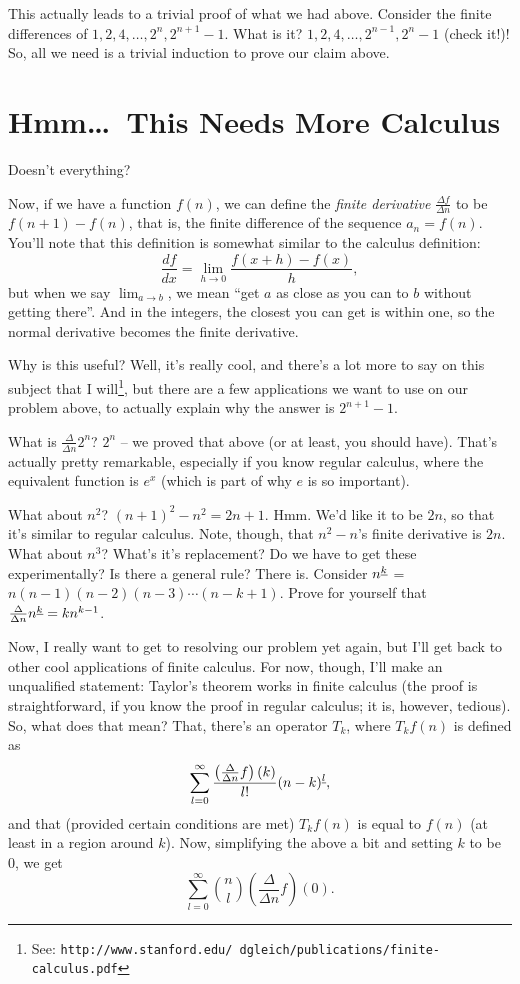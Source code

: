 \documentclass[12pt,letterpaper]{article}
\begin{document}
This actually leads to a trivial proof of what we had above. Consider
the finite differences of $1, 2, 4, \ldots, 2^n, 2^{n+1}-1$. What is
it? $1, 2, 4, \ldots, 2^{n-1}, 2^n-1$ (check it!)! So, all we need is
a trivial induction to prove our claim above.

\section{Hmm\dots\ This Needs More Calculus}
Doesn't everything?

Now, if we have a function $f(n)$, we can define the \emph{finite
derivative} $\frac{\Delta f}{\Delta n}$ to be $f(n+1)-f(n)$, that is,
the finite difference of the sequence $a_n = f(n)$. You'll note that
this definition is somewhat similar to the calculus definition:
$$\frac{df}{dx} = \lim_{h\to0}\frac{f(x+h) - f(x)}{h},$$ but when
we say $\lim_{a\to b}$, we mean ``get $a$ as close as you can to $b$
without getting there''. And in the integers, the closest you can get
is within one, so the normal derivative becomes the finite
derivative.

Why is this useful? Well, it's really cool, and there's a lot more to
say on this subject that I will\footnote{See:
\texttt{http://www.stanford.edu/\string~dgleich/publications/finite-calculus.pdf}},
but there are a few applications we want to use on our problem above,
to actually explain why the answer is $2^{n+1}-1$.

What is $\frac{\Delta}{\Delta n} 2^n$? $2^n$ -- we proved that above
(or at least, you should have). That's actually pretty remarkable,
especially if you know regular calculus, where the equivalent function
is $e^x$ (which is part of why $e$ is so important).

What about $n^2$? $(n+1)^2 - n^2 = 2n + 1$. Hmm. We'd like it to be
$2n$, so that it's similar to regular calculus. Note, though, that
$n^2 - n$'s finite derivative is $2n$. What
about $n^3$? What's it's replacement? Do we have to get these
experimentally? Is there a general rule? There is. Consider
$n^{\uline k}$ = $n (n-1) (n-2) (n-3) \cdots (n-k+1)$. Prove for
yourself that $\frac{\Delta}{\Delta n} n^{\uline k} = k n^{k-1}$.

Now, I really want to get to resolving our problem yet again, but I'll
get back to other cool applications of finite calculus. For now,
though, I'll make an unqualified statement: Taylor's theorem works in
finite calculus (the proof is straightforward, if you know the proof
in regular calculus; it is, however, tedious). So, what does that
mean? That, there's an operator $T_k$, where $T_k f(n)$ is defined as
$$\sum_{l=0}^{\infty} \frac{\left(\frac{\Delta}{\Delta n} f\right)(k)}{l!}
(n-k)^{\uline l},$$ and that (provided certain conditions are met) $T_k f(n)$
is equal to $f(n)$ (at least in a region around $k$). Now, simplifying
the above a bit and setting $k$ to be 0, we get $$\sum_{l=0}^\infty
\binom{n}{l} \left(\frac{\Delta}{\Delta n} f\right)(0).$$
\end{document}
